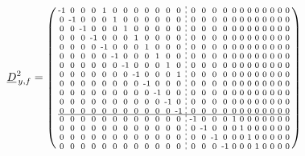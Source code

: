 \documentclass[pdftex,a4paper,parskip,listof=totoc,bibliography=totoc,onehalfspacing,12pt]{scrreprt}
\newcommand*\dashline{\hspace{-0.3em}\rotatebox[origin=c]{90}{\scalebox{-0.3}[1]{$-~~-$}}\hspace{-0.3em}}
\begin{document}
\begin{align*}
	\underline{D}_{\,y,f}^2 &= \begin{psmallmatrix}
\text{-}1 & 0 & 0 & 0 & 1 & 0 & 0 & 0 & 0 & 0 & 0 & 0 &\dashline& 0 & 0 & 0 & 0 & 0 & 0 & 0 & 0 & 0 & 0 & 0 & 0 \\
0 & \text{-}1 & 0 & 0 & 0 & 1 & 0 & 0 & 0 & 0 & 0 & 0 &\dashline& 0 & 0 & 0 & 0 & 0 & 0 & 0 & 0 & 0 & 0 & 0 & 0 \\
0 & 0 & \text{-}1 & 0 & 0 & 0 & 1 & 0 & 0 & 0 & 0 & 0 &\dashline& 0 & 0 & 0 & 0 & 0 & 0 & 0 & 0 & 0 & 0 & 0 & 0 \\
0 & 0 & 0 & \text{-}1 & 0 & 0 & 0 & 1 & 0 & 0 & 0 & 0 &\dashline& 0 & 0 & 0 & 0 & 0 & 0 & 0 & 0 & 0 & 0 & 0 & 0 \\
0 & 0 & 0 & 0 & \text{-}1 & 0 & 0 & 0 & 1 & 0 & 0 & 0 &\dashline& 0 & 0 & 0 & 0 & 0 & 0 & 0 & 0 & 0 & 0 & 0 & 0 \\
0 & 0 & 0 & 0 & 0 & \text{-}1 & 0 & 0 & 0 & 1 & 0 & 0 &\dashline& 0 & 0 & 0 & 0 & 0 & 0 & 0 & 0 & 0 & 0 & 0 & 0 \\
0 & 0 & 0 & 0 & 0 & 0 & \text{-}1 & 0 & 0 & 0 & 1 & 0 &\dashline& 0 & 0 & 0 & 0 & 0 & 0 & 0 & 0 & 0 & 0 & 0 & 0 \\
0 & 0 & 0 & 0 & 0 & 0 & 0 & \text{-}1 & 0 & 0 & 0 & 1 &\dashline& 0 & 0 & 0 & 0 & 0 & 0 & 0 & 0 & 0 & 0 & 0 & 0 \\
0 & 0 & 0 & 0 & 0 & 0 & 0 & 0 & \text{-}1 & 0 & 0 & 0 &\dashline& 0 & 0 & 0 & 0 & 0 & 0 & 0 & 0 & 0 & 0 & 0 & 0 \\
0 & 0 & 0 & 0 & 0 & 0 & 0 & 0 & 0 & \text{-}1 & 0 & 0 &\dashline& 0 & 0 & 0 & 0 & 0 & 0 & 0 & 0 & 0 & 0 & 0 & 0 \\
0 & 0 & 0 & 0 & 0 & 0 & 0 & 0 & 0 & 0 & \text{-}1 & 0 &\dashline& 0 & 0 & 0 & 0 & 0 & 0 & 0 & 0 & 0 & 0 & 0 & 0 \\
0 & 0 & 0 & 0 & 0 & 0 & 0 & 0 & 0 & 0 & 0 & \text{-}1 &\dashline& 0 & 0 & 0 & 0 & 0 & 0 & 0 & 0 & 0 & 0 & 0 & 0 \\\hline
0 & 0 & 0 & 0 & 0 & 0 & 0 & 0 & 0 & 0 & 0 & 0 &\dashline& \text{-}1 & 0 & 0 & 0 & 1 & 0 & 0 & 0 & 0 & 0 & 0 & 0 \\
0 & 0 & 0 & 0 & 0 & 0 & 0 & 0 & 0 & 0 & 0 & 0 &\dashline& 0 & \text{-}1 & 0 & 0 & 0 & 1 & 0 & 0 & 0 & 0 & 0 & 0 \\
0 & 0 & 0 & 0 & 0 & 0 & 0 & 0 & 0 & 0 & 0 & 0 &\dashline& 0 & 0 & \text{-}1 & 0 & 0 & 0 & 1 & 0 & 0 & 0 & 0 & 0 \\
0 & 0 & 0 & 0 & 0 & 0 & 0 & 0 & 0 & 0 & 0 & 0 &\dashline& 0 & 0 & 0 & \text{-}1 & 0 & 0 & 0 & 1 & 0 & 0 & 0 & 0 \\

\end{psmallmatrix}
\end{align*}
\end{document}
